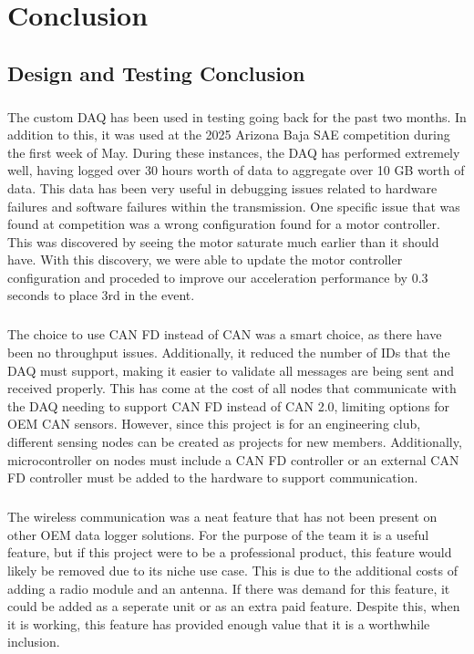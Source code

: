 \chapter{Conclusion}

\section{Design and Testing Conclusion}

\paragraph{}
The custom DAQ has been used in testing going back for the past two months.
In addition to this, it was used at the 2025 Arizona Baja SAE competition during the first week of May.
During these instances, the DAQ has performed extremely well, having logged over 30 hours worth of data to aggregate over 10 GB worth of data.
This data has been very useful in debugging issues related to hardware failures and software failures within the transmission.
One specific issue that was found at competition was a wrong configuration found for a motor controller.
This was discovered by seeing the motor saturate much earlier than it should have.
With this discovery, we were able to update the motor controller configuration and proceded to improve our acceleration performance by 0.3 seconds to place 3rd in the event.

\paragraph{}
The choice to use CAN FD instead of CAN was a smart choice, as there have been no throughput issues.
Additionally, it reduced the number of IDs that the DAQ must support, making it easier to validate all messages are being sent and received properly.
This has come at the cost of all nodes that communicate with the DAQ needing to support CAN FD instead of CAN 2.0, limiting options for OEM CAN sensors.
However, since this project is for an engineering club, different sensing nodes can be created as projects for new members.
Additionally, microcontroller on nodes must include a CAN FD controller or an external CAN FD controller must be added to the hardware to support communication.

\paragraph{}
The wireless communication was a neat feature that has not been present on other OEM data logger solutions.
For the purpose of the team it is a useful feature, but if this project were to be a professional product, this feature would likely be removed due to its niche use case.
This is due to the additional costs of adding a radio module and an antenna.
If there was demand for this feature, it could be added as a seperate unit or as an extra paid feature.
Despite this, when it is working, this feature has provided enough value that it is a worthwhile inclusion.

